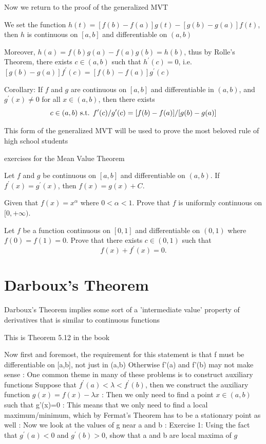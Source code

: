 Now we return to the proof of the generalized MVT

We set the function $h(t)=[f(b)-f(a)]g(t)-[g(b)-g(a)]f(t)$, then $h$ is continuous on $[a,b]$ and differentiable on $(a,b)$

Moreover, $h(a)=f(b)g(a)-f(a)g(b)=h(b)$, thus by Rolle's Theorem, there exists $c\in(a,b)$ such that $h^\prime(c)=0$, i.e. $[g(b)-g(a)]f^\prime(c)=[f(b)-f(a)]g^\prime(c)$

Corollary: If $f$ and $g$ are continuous on $[a,b]$ and differentiable in $(a,b)$, and $g^\prime(x)\neq0$ for all $x\in(a,b)$, then there exists \[ c\in(a,b) \text{ s.t. } f^\prime(c)/g^\prime(c)=[f(b)-f(a)]/[g(b)-g(a)] \]

This form of the generalized MVT will be used to prove the most beloved rule of high school students

exercises for the Mean Value Theorem

\begin{exercise}
Let $f$ and $g$ be continuous on $[a,b]$ and differentiable on $(a,b)$. If $f^\prime(x)=g^\prime(x)$, then $f(x)=g(x)+C$.
\end{exercise}

\begin{exercise}
Given that $f(x)=x^\alpha$ where $0<\alpha<1$. Prove that $f$ is uniformly continuous on $[0,+\infty)$.
\end{exercise}

\begin{exercise}
Let $f$ be a function continuous on $[0,1]$ and differentiable on $(0,1)$ where $f(0)=f(1)=0$. Prove that there exists $c\in(0,1)$ such that
\[ f(x)+f^\prime(x)=0. \]
\end{exercise}

\section{Darboux's Theorem}
Darboux's Theorem implies some sort of a 'intermediate value' property of derivatives that is similar to continuous functions

This is Theorem 5.12 in the book

Now first and foremost, the requirement for this statement is that f must be differentiable on [a,b], not just in (a,b)
Otherwise f'(a) and f'(b) may not make sense
:
One common theme in many of these problems is to construct auxiliary functions
Suppose that $f^\prime(a)<\lambda<f^\prime(b)$, then we construct the auxiliary function $g(x)=f(x)-\lambda x$
:
Then we only need to find a point $x\in(a,b)$ such that g'(x)=0
:
This means that we only need to find a local maximum/minimum, which by Fermat's Theorem has to be a stationary point as well
:
Now we look at the values of g near a and b
:
Exercise 1: Using the fact that $g^\prime(a)<0$ and $g^\prime(b)>0$, show that a and b are local maxima of $g$


